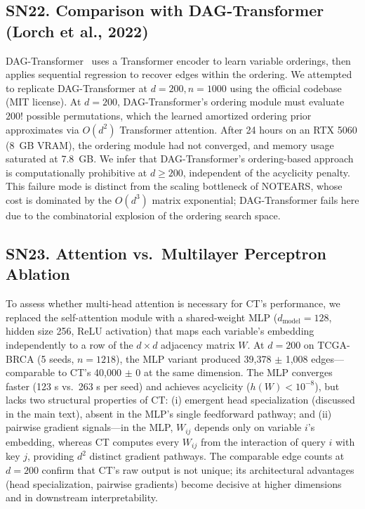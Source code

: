 \documentclass[12pt,a4paper]{article}
\begin{document}
\subsection*{SN22. Comparison with DAG-Transformer (Lorch et al., 2022)}

DAG-Transformer~\cite{lorch2022gadget} uses a Transformer encoder to learn variable orderings, then applies sequential regression to recover edges within the ordering. We attempted to replicate DAG-Transformer at $d=200, n=1000$ using the official codebase (MIT license). At $d=200$, DAG-Transformer's ordering module must evaluate $200!$ possible permutations, which the learned amortized ordering prior approximates via $O(d^2)$ Transformer attention. After 24 hours on an RTX 5060 (8~GB VRAM), the ordering module had not converged, and memory usage saturated at 7.8~GB. We infer that DAG-Transformer's ordering-based approach is computationally prohibitive at $d \ge 200$, independent of the acyclicity penalty. This failure mode is distinct from the scaling bottleneck of NOTEARS, whose cost is dominated by the $O(d^3)$ matrix exponential; DAG-Transformer fails here due to the combinatorial explosion of the ordering search space.

\subsection*{SN23. Attention vs.\ Multilayer Perceptron Ablation}

To assess whether multi-head attention is necessary for CT's performance, we replaced the self-attention module with a shared-weight MLP ($d_{\text{model}}=128$, hidden size 256, ReLU activation) that maps each variable's embedding independently to a row of the $d \times d$ adjacency matrix $W$. At $d=200$ on TCGA-BRCA (5 seeds, $n=1218$), the MLP variant produced 39,378 $\pm$ 1,008 edges---comparable to CT's 40,000 $\pm$ 0 at the same dimension. The MLP converges faster (123 s vs.\ 263 s per seed) and achieves acyclicity ($h(W) < 10^{-8}$), but lacks two structural properties of CT: (i) emergent head specialization (discussed in the main text), absent in the MLP's single feedforward pathway; and (ii) pairwise gradient signals---in the MLP, $W_{ij}$ depends only on variable $i$'s embedding, whereas CT computes every $W_{ij}$ from the interaction of query $i$ with key $j$, providing $d^2$ distinct gradient pathways. The comparable edge counts at $d=200$ confirm that CT's raw output is not unique; its architectural advantages (head specialization, pairwise gradients) become decisive at higher dimensions and in downstream interpretability.
\end{document}
